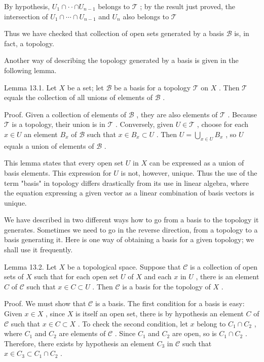 \documentclass[10pt]{article}
\begin{document}
By hypothesis, \({U}_{1} \cap   \cdot   \cdot   \cap  {U}_{n - 1}\) belongs to \(\mathcal{T}\) ; by the result just proved, the intersection of \({U}_{1} \cap  \cdots  \cap  {U}_{n - 1}\) and \({U}_{n}\) also belongs to \(\mathcal{T}\)

Thus we have checked that collection of open sets generated by a basis \(\mathcal{B}\) is, in fact, a topology.

Another way of describing the topology generated by a basis is given in the following lemma.

Lemma 13.1. Let \(X\) be a set; let \(\mathcal{B}\) be a basis for a topology \(\mathcal{T}\) on \(X\) . Then \(\mathcal{T}\) equals the collection of all unions of elements of \(\mathcal{B}\) .

Proof. Given a collection of elements of \(\mathcal{B}\) , they are also elements of \(\mathcal{T}\) . Because \(\mathcal{T}\) is a topology, their union is in \(\mathcal{T}\) . Conversely, given \(U \in  \mathcal{T}\) , choose for each \(x \in  U\) an element \({B}_{x}\) of \(\mathcal{B}\) such that \(x \in  {B}_{x} \subset  U\) . Then \(U = \mathop{\bigcup }\limits_{{x \in  U}}{B}_{x}\) , so \(U\) equals a union of elements of \(\mathcal{B}\) .

This lemma states that every open set \(U\) in \(X\) can be expressed as a union of basis elements. This expression for \(U\) is not, however, unique. Thus the use of the term "basis" in topology differs drastically from its use in linear algebra, where the equation expressing a given vector as a linear combination of basis vectors is unique.

We have described in two different ways how to go from a basis to the topology it generates. Sometimes we need to go in the reverse direction, from a topology to a basis generating it. Here is one way of obtaining a basis for a given topology; we shall use it frequently.

Lemma 13.2. Let \(X\) be a topological space. Suppose that \(\mathcal{C}\) is a collection of open sets of \(X\) such that for each open set \(U\) of \(X\) and each \(x\) in \(U\) , there is an element \(C\) of \(\mathcal{C}\) such that \(x \in  C \subset  U\) . Then \(\mathcal{C}\) is a basis for the topology of \(X\) .

Proof. We must show that \(\mathcal{C}\) is a basis. The first condition for a basis is easy: Given \(x \in  X\) , since \(X\) is itself an open set, there is by hypothesis an element \(C\) of \(\mathcal{C}\) such that \(x \in  C \subset  X\) . To check the second condition, let \(x\) belong to \({C}_{1} \cap  {C}_{2}\) , where \({C}_{1}\) and \({C}_{2}\) are elements of \(\mathcal{C}\) . Since \({C}_{1}\) and \({C}_{2}\) are open, so is \({C}_{1} \cap  {C}_{2}\) . Therefore, there exists by hypothesis an element \({C}_{3}\) in \(\mathcal{C}\) such that \(x \in  {C}_{3} \subset  {C}_{1} \cap  {C}_{2}\) .
\end{document}
